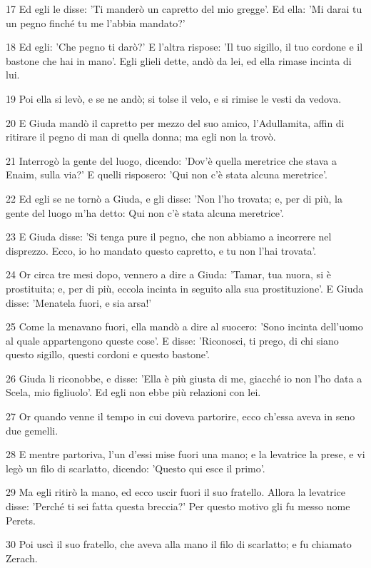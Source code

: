 \par 17 Ed egli le disse: 'Ti manderò un capretto del mio gregge'. Ed ella: 'Mi darai tu un pegno finché tu me l'abbia mandato?'
\par 18 Ed egli: 'Che pegno ti darò?' E l'altra rispose: 'Il tuo sigillo, il tuo cordone e il bastone che hai in mano'. Egli glieli dette, andò da lei, ed ella rimase incinta di lui.
\par 19 Poi ella si levò, e se ne andò; si tolse il velo, e si rimise le vesti da vedova.
\par 20 E Giuda mandò il capretto per mezzo del suo amico, l'Adullamita, affin di ritirare il pegno di man di quella donna; ma egli non la trovò.
\par 21 Interrogò la gente del luogo, dicendo: 'Dov'è quella meretrice che stava a Enaim, sulla via?' E quelli risposero: 'Qui non c'è stata alcuna meretrice'.
\par 22 Ed egli se ne tornò a Giuda, e gli disse: 'Non l'ho trovata; e, per di più, la gente del luogo m'ha detto: Qui non c'è stata alcuna meretrice'.
\par 23 E Giuda disse: 'Si tenga pure il pegno, che non abbiamo a incorrere nel disprezzo. Ecco, io ho mandato questo capretto, e tu non l'hai trovata'.
\par 24 Or circa tre mesi dopo, vennero a dire a Giuda: 'Tamar, tua nuora, si è prostituita; e, per di più, eccola incinta in seguito alla sua prostituzione'. E Giuda disse: 'Menatela fuori, e sia arsa!'
\par 25 Come la menavano fuori, ella mandò a dire al suocero: 'Sono incinta dell'uomo al quale appartengono queste cose'. E disse: 'Riconosci, ti prego, di chi siano questo sigillo, questi cordoni e questo bastone'.
\par 26 Giuda li riconobbe, e disse: 'Ella è più giusta di me, giacché io non l'ho data a Scela, mio figliuolo'. Ed egli non ebbe più relazioni con lei.
\par 27 Or quando venne il tempo in cui doveva partorire, ecco ch'essa aveva in seno due gemelli.
\par 28 E mentre partoriva, l'un d'essi mise fuori una mano; e la levatrice la prese, e vi legò un filo di scarlatto, dicendo: 'Questo qui esce il primo'.
\par 29 Ma egli ritirò la mano, ed ecco uscir fuori il suo fratello. Allora la levatrice disse: 'Perché ti sei fatta questa breccia?' Per questo motivo gli fu messo nome Perets.
\par 30 Poi uscì il suo fratello, che aveva alla mano il filo di scarlatto; e fu chiamato Zerach.

